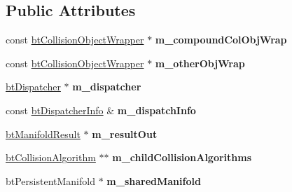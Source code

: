 \subsection*{Public Attributes}
\begin{DoxyCompactItemize}
\item 
\hypertarget{structbt_compound_leaf_callback_af16bb32915bf909ffe4ba6672514f2af}{const \hyperlink{structbt_collision_object_wrapper}{bt\+Collision\+Object\+Wrapper} $\ast$ {\bfseries m\+\_\+compound\+Col\+Obj\+Wrap}}\label{structbt_compound_leaf_callback_af16bb32915bf909ffe4ba6672514f2af}

\item 
\hypertarget{structbt_compound_leaf_callback_a096ee0c482f6bd286507db9d3e1ab18e}{const \hyperlink{structbt_collision_object_wrapper}{bt\+Collision\+Object\+Wrapper} $\ast$ {\bfseries m\+\_\+other\+Obj\+Wrap}}\label{structbt_compound_leaf_callback_a096ee0c482f6bd286507db9d3e1ab18e}

\item 
\hypertarget{structbt_compound_leaf_callback_a42a7482c4e324fdc9ce85e88b9e96fe1}{\hyperlink{classbt_dispatcher}{bt\+Dispatcher} $\ast$ {\bfseries m\+\_\+dispatcher}}\label{structbt_compound_leaf_callback_a42a7482c4e324fdc9ce85e88b9e96fe1}

\item 
\hypertarget{structbt_compound_leaf_callback_aaac00f6e3e42c52357ba516521b8f347}{const \hyperlink{structbt_dispatcher_info}{bt\+Dispatcher\+Info} \& {\bfseries m\+\_\+dispatch\+Info}}\label{structbt_compound_leaf_callback_aaac00f6e3e42c52357ba516521b8f347}

\item 
\hypertarget{structbt_compound_leaf_callback_aa6c200cd136e8434cbadf7bc93193445}{\hyperlink{classbt_manifold_result}{bt\+Manifold\+Result} $\ast$ {\bfseries m\+\_\+result\+Out}}\label{structbt_compound_leaf_callback_aa6c200cd136e8434cbadf7bc93193445}

\item 
\hypertarget{structbt_compound_leaf_callback_aae32b57467dcfb833de4829819bb642b}{\hyperlink{classbt_collision_algorithm}{bt\+Collision\+Algorithm} $\ast$$\ast$ {\bfseries m\+\_\+child\+Collision\+Algorithms}}\label{structbt_compound_leaf_callback_aae32b57467dcfb833de4829819bb642b}

\item 
\hypertarget{structbt_compound_leaf_callback_a4db60ab914ea033b570c25bb4972bdae}{bt\+Persistent\+Manifold $\ast$ {\bfseries m\+\_\+shared\+Manifold}}\label{structbt_compound_leaf_callback_a4db60ab914ea033b570c25bb4972bdae}

\end{DoxyCompactItemize}


